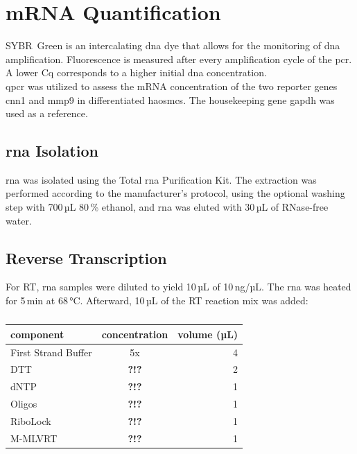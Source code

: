 \section{mRNA Quantification}
\label{sec:qpcr}
SYBR\textregistered~Green is an intercalating \ac{dna} dye that allows for the monitoring of \ac{dna} amplification. Fluorescence is measured after every amplification cycle of the \ac{pcr}. A lower \ac{Cq} corresponds to a higher initial \ac{dna} concentration. \cite{huggettStandardisationReportingNucleic2011}\\
\Ac{qpcr} was utilized to assess the \ac{mRNA} concentration of the two reporter genes \ac{cnn1} and \ac{mmp9} in differentiated \acp{haosmc}. The housekeeping gene \ac{gapdh} was used as a reference.


    \subsection{\ac{rna} Isolation}
    \ac{rna} was isolated using the Total \ac{rna} Purification Kit. The extraction was performed according to the manufacturer's protocol, using the optional washing step with 700\,µL 80\,\% ethanol, and \ac{rna} was eluted with 30\,µL of RNase-free water.

    \subsection{Reverse Transcription}
    For \ac{RT}, \ac{rna} samples were diluted to yield 10\,µL of 10\,ng/µL. The \ac{rna} was heated for 5\,min at 68\,°C. Afterward, 10\,µL of the \ac{RT} reaction mix was added:

    \begin{table}[h]
    \capstart
	\centering
	\begin{minipage}{\captionwidth}
	   	\caption[RT mastermix]{}
	   	\label{tab:RT Mastr Mix}
	\end{minipage}
    \begin{tabular}{|l|c|r|}
        \hline
        component               & concentration & volume (µL) \\ \hline
        First Strand Buffer     & 5x            & 4           \\
        \acs{DTT}               &\textbf{\color{red} ?!?}               & 2           \\
        \acs{dNTP}              &\textbf{\color{red} ?!?}               & 1           \\
        Oligos                  &\textbf{\color{red} ?!?}               & 1           \\
        RiboLock                &\textbf{\color{red} ?!?}               & 1           \\
        M-MLVRT                 &\textbf{\color{red} ?!?}               & 1           \\ \hline
    \end{tabular}
    \end{table}

